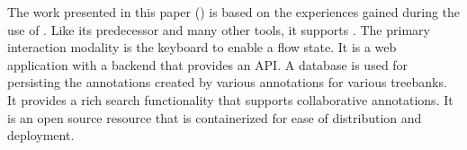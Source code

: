The work presented in this paper (\boatvtwo) is based on the experiences gained during the use of \boatvone.
Like its predecessor and many other tools, it supports \ud. 
The primary interaction modality is the keyboard to enable a flow state. 
It is a web application with a backend that provides an API.
A database is used for persisting the annotations created by various annotations for various treebanks. 
It provides a rich search functionality that supports collaborative annotations. 
It is an open source resource that is containerized for ease of distribution and deployment.
